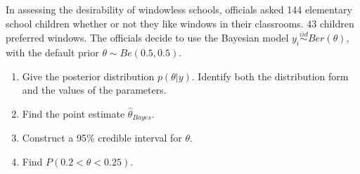   \item 
    In assessing the desirability of windowless schools, officials asked 144
    elementary school children whether or not they like windows in their
    classrooms. 43 children preferred windows. The officials decide to use the Bayesian model $y_i\stackrel{iid}{\sim}Ber(\theta)$, with the default prior $\theta \sim Be(0.5,0.5)$.
    \begin{enumerate}
      \item Give the posterior distribution $ p(\theta | y)$. Identify both the distribution form and the values of the parameters. 
      \item Find the point estimate $\hat{\theta}_{Bayes}$. 
      \item Construct a 95\% credible interval for $\theta$. 
      \item Find $P(0.2<\theta<0.25)$.
\end{enumerate}

